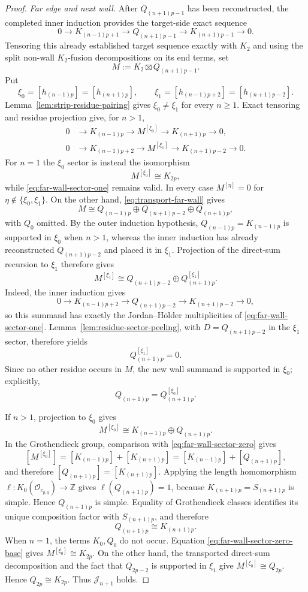 \documentclass[12pt,leqno]{amsart}
\numberwithin{equation}{section}
\newcommand{\boxt}{\boxtimes}
\newcommand{\Oc}{\mathcal O}
\def\Z{\mathbb{Z}}
\begin{document}
\begin{proof}
\smallskip
\noindent\emph{Far edge and next wall.}
After $Q_{(n+1)p-1}$ has been reconstructed, the completed inner induction
provides the target-side exact sequence
\[
 0\longrightarrow K_{(n-1)p+1}
 \longrightarrow Q_{(n+1)p-1}
 \longrightarrow K_{(n+1)p-1}
 \longrightarrow0.
\]
Tensoring this already established target sequence exactly with $K_2$ and
using the split non-wall $K_2$-fusion decompositions on its end terms, set
\[
 M:=K_2\boxt Q_{(n+1)p-1}.
\]
Put
\[
 \xi_0=[h_{(n-1)p}]=[h_{(n+1)p}],\qquad
 \xi_1=[h_{(n-1)p+2}]=[h_{(n+1)p-2}].
\]
Lemma~\ref{lem:strip-residue-pairing} gives $\xi_0\ne\xi_1$ for every
$n\ge1$.  Exact tensoring and residue projection give, for $n>1$,
\begin{align}
 0&\to K_{(n-1)p}\to M^{[\xi_0]}
      \to K_{(n+1)p}\to0,\label{eq:far-wall-sector-zero}\\
 0&\to K_{(n-1)p+2}\to M^{[\xi_1]}
      \to K_{(n+1)p-2}\to0.\label{eq:far-wall-sector-one}
\end{align}
For $n=1$ the $\xi_0$ sector is instead the isomorphism
\begin{equation}\label{eq:far-wall-sector-zero-base}
 M^{[\xi_0]}\cong K_{2p},
\end{equation}
while \eqref{eq:far-wall-sector-one} remains valid.  In every case
$M^{[\eta]}=0$ for $\eta\notin\{\xi_0,\xi_1\}$.  On the other hand,
\eqref{eq:transport-far-wall} gives
\[
 M\cong Q_{(n-1)p}\oplus Q_{(n+1)p-2}\oplus Q_{(n+1)p},
\]
with $Q_0$ omitted.  By the outer induction hypothesis,
$Q_{(n-1)p}=K_{(n-1)p}$ is supported in $\xi_0$ when $n>1$, whereas the
inner induction has already reconstructed $Q_{(n+1)p-2}$ and placed it in
$\xi_1$.  Projection of the direct-sum
recursion to $\xi_1$ therefore gives
\[
 M^{[\xi_1]}
 \cong Q_{(n+1)p-2}\oplus Q_{(n+1)p}^{[\xi_1]}.
\]
Indeed, the inner induction gives
\[
 0\to K_{(n-1)p+2}\to Q_{(n+1)p-2}
 \to K_{(n+1)p-2}\to0,
\]
so this summand has exactly the Jordan--H\"older multiplicities of
\eqref{eq:far-wall-sector-one}.  Lemma~\ref{lem:residue-sector-peeling}, with
$D=Q_{(n+1)p-2}$ in the $\xi_1$ sector, therefore yields
\[
 Q_{(n+1)p}^{[\xi_1]}=0.
\]
Since no other residue occurs in $M$, the new wall summand is supported in
$\xi_0$; explicitly,
\[
 Q_{(n+1)p}=Q_{(n+1)p}^{[\xi_0]}.
\]

If $n>1$, projection to $\xi_0$ gives
\[
 M^{[\xi_0]}\cong K_{(n-1)p}\oplus Q_{(n+1)p}.
\]
In the Grothendieck group, comparison with
\eqref{eq:far-wall-sector-zero} gives
\[
 [M^{[\xi_0]}]=[K_{(n-1)p}]+[K_{(n+1)p}]
 =[K_{(n-1)p}]+[Q_{(n+1)p}],
\]
and therefore $[Q_{(n+1)p}]=[K_{(n+1)p}]$.  Applying the length
homomorphism $\ell:K_0(\Oc_{c_{p,q}})\to\Z$ gives
$\ell(Q_{(n+1)p})=1$, because $K_{(n+1)p}=S_{(n+1)p}$ is simple.  Hence
$Q_{(n+1)p}$ is simple.  Equality of Grothendieck classes identifies its
unique composition factor with $S_{(n+1)p}$, and therefore
\[
 Q_{(n+1)p}\cong K_{(n+1)p}.
\]
When $n=1$, the terms $K_0,Q_0$ do not occur.  Equation
\eqref{eq:far-wall-sector-zero-base} gives $M^{[\xi_0]}\cong K_{2p}$.  On the
other hand, the transported direct-sum decomposition and the fact that
$Q_{2p-2}$ is supported in $\xi_1$ give
$M^{[\xi_0]}\cong Q_{2p}$.  Hence $Q_{2p}\cong K_{2p}$.  Thus
$\mathcal J_{n+1}$ holds.


\end{proof}
\end{document}
